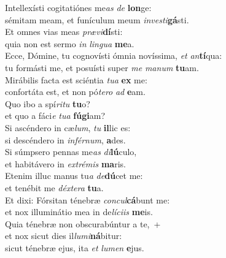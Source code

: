 \evenverse Intellexísti cogitatiónes me\textit{as} \textit{de} \textbf{lon}ge:~\*\\
\evenverse sémitam meam, et funículum meum \textit{in}\textit{ve}\textit{sti}\textbf{gá}sti.\\
\oddverse Et omnes vias meas \textit{præ}\textit{vi}\textbf{dí}sti:~\*\\
\oddverse quia non est sermo \textit{in} \textit{lin}\textit{gua} \textbf{me}a.\\
\evenverse Ecce, Dómine, tu cognovísti ómnia novíssima, \textit{et} \textit{an}\textbf{tí}qua:~\*\\
\evenverse tu formásti me, et posuísti super \textit{me} \textit{ma}\textit{num} \textbf{tu}am.\\
\oddverse Mirábilis facta est sciéntia \textit{tu}\textit{a} \textbf{ex} me:~\*\\
\oddverse confortáta est, et non pó\textit{te}\textit{ro} \textit{ad} \textbf{e}am.\\
\evenverse Quo ibo a spí\textit{ri}\textit{tu} \textbf{tu}o?~\*\\
\evenverse et quo a fáci\textit{e} \textit{tu}\textit{a} \textbf{fú}\textbf{gi}am?\\
\oddverse Si ascéndero in cæ\textit{lum}, \textit{tu} \textbf{il}lic es:~\*\\
\oddverse si descéndero in \textit{in}\textit{fér}\textit{num}, \textbf{a}des.\\
\evenverse Si súmpsero pennas me\textit{as} \textit{di}\textbf{lú}culo,~\*\\
\evenverse et habitávero in \textit{ex}\textit{tré}\textit{mis} \textbf{ma}ris.\\
\oddverse Etenim illuc manus tu\textit{a} \textit{de}\textbf{dú}cet me:~\*\\
\oddverse et tenébit me \textit{déx}\textit{te}\textit{ra} \textbf{tu}a.\\
\evenverse Et dixi: Fórsitan ténebræ \textit{con}\textit{cul}\textbf{cá}bunt me:~\*\\
\evenverse et nox illuminátio mea in de\textit{lí}\textit{ci}\textit{is} \textbf{me}is.\\
\oddverse Quia ténebræ non obscurabúntur a te,~+\\
\oddverse  et nox sicut dies il\textit{lu}\textit{mi}\textbf{ná}bitur:~\*\\
\oddverse sicut ténebræ ejus, ita \textit{et} \textit{lu}\textit{men} \textbf{e}jus.\\
